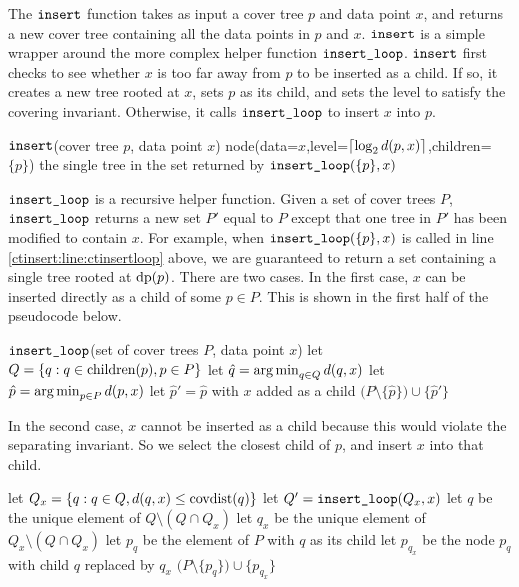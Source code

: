 \documentclass[../main.tex]{subfiles}
\newcommand{\dist}[2]{\distf({#1},{#2})}
\newcommand{\distf}{d}
\newcommand{\mkfunction}[1]{\ifmmode{\text{{#1}}}}
\newcommand{\level}[1]      {\mkfunction{level}({#1})}
\newcommand{\children}[1]   {\mkfunction{children}({#1})}
\newcommand{\covdist}[1]    {\mkfunction{covdist}({#1})}
\newcommand{\data}[1]         {\mkfunction{dp}({#1})}
\newcommand{\ctinsert}{\ensuremath{\textnormal{\ttfamily insert}}}
\newcommand{\ctinsertloop}{\ensuremath{\textnormal{\ttfamily insert\_loop}}}
\begin{document}
The $\ctinsert$ function takes as input a cover tree $p$ and data point $x$,
and returns a new cover tree containing all the data points in $p$ and $x$.
$\ctinsert$ is a simple wrapper around the more complex helper function $\ctinsertloop$.
$\ctinsert$ first checks to see whether $x$ is too far away from $p$ to be inserted as a child.
If so, it creates a new tree rooted at $x$,
sets $p$ as its child,
and sets the level to satisfy the covering invariant.
Otherwise, it calls $\ctinsertloop$ to insert $x$ into $p$.
\begin{pseudocode}{\ctinsert(cover tree $p$, data point $x$)}
    \If {$\dist{p}{x} > \covdist{p}$}
        \State \Return node(data=$x$,level=$\ceil{\log_2 \dist{p}{x}}$,children=$\{p\}$)
    \Else
        \State \Return the single tree in the set returned by $\ctinsertloop(\{p\},x)$
        \label{ctinsert:line:ctinsertloop}
    \EndIf
\end{pseudocode}
\noindent
$\ctinsertloop$ is a recursive helper function. 
Given a set of cover trees $P$, 
$\ctinsertloop$ returns a new set $P'$ equal to $P$ except that one tree in $P'$ has been modified to contain $x$.
For example, when $\ctinsertloop(\{p\},x)$ is called in line \ref{ctinsert:line:ctinsertloop} above,
we are guaranteed to return a set containing a single tree rooted at $\data{p}$.
There are two cases.
In the first case, $x$ can be inserted directly as a child of some $p\in P$.
This is shown in the first half of the pseudocode below.
\begin{pseudocodeT}{\ctinsertloop(set of cover trees $P$, data point $x$)}
    \State let $Q = \{ q : q \in \children{p}, p\in P\}$
    \State let $\hat q = \argmin_{q\in Q} \dist{q}{x}$
    \If {$\dist{\hat q}{x} \ge \covdist{\hat q}$}
        \State let $\hat p = \argmin_{p\in P} \dist{p}{x}$
        \State let $\hat p' = \hat p$ with $x$ added as a child
        \State \Return $\big(P\setminus\{\hat p\}\big) \cup \{\hat p'\}$
\end{pseudocodeT}
\noindent
In the second case, $x$ cannot be inserted as a child because this would violate the separating invariant.
So we select the closest child of $p$, and insert $x$ into that child.
\begin{pseudocodeB}
    \Else
        \State let $Q_x = \{q : q\in Q, \dist{q}{x} \le \covdist{q}\}$
        \State let $Q' = \ctinsertloop(Q_x, x)$
        \State let $q$   be the unique element of $Q  \setminus(Q\cap Q_x)$
        \State let $q_x$ be the unique element of $Q_x\setminus(Q\cap Q_x)$
        \State let $p_q$ be the element of $P$ with $q$ as its child
        \State let $p_{q_x}$ be the node $p_q$ with child $q$ replaced by $q_x$
        \State \Return $\big(P\setminus\{p_q\}\big) \cup \{p_{q_x}\}$
    \EndIf
\end{pseudocodeB}
\end{document}
